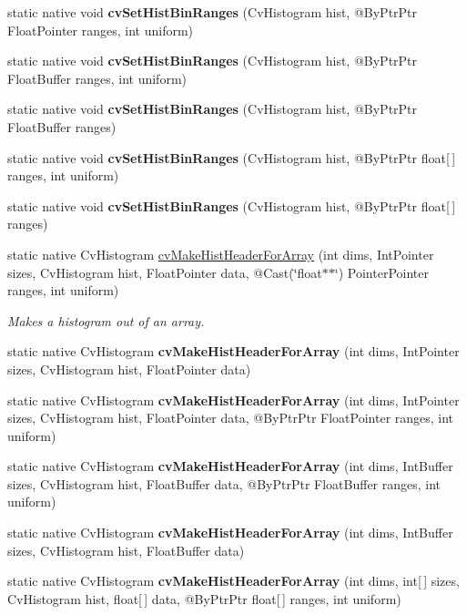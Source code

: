 \begin{DoxyCompactItemize}
\item 
static native void {\bfseries cv\+Set\+Hist\+Bin\+Ranges} (Cv\+Histogram hist, @By\+Ptr\+Ptr Float\+Pointer ranges, int uniform)
\item 
static native void {\bfseries cv\+Set\+Hist\+Bin\+Ranges} (Cv\+Histogram hist, @By\+Ptr\+Ptr Float\+Buffer ranges, int uniform)
\item 
static native void {\bfseries cv\+Set\+Hist\+Bin\+Ranges} (Cv\+Histogram hist, @By\+Ptr\+Ptr Float\+Buffer ranges)
\item 
static native void {\bfseries cv\+Set\+Hist\+Bin\+Ranges} (Cv\+Histogram hist, @By\+Ptr\+Ptr float\mbox{[}$\,$\mbox{]} ranges, int uniform)
\item 
static native void {\bfseries cv\+Set\+Hist\+Bin\+Ranges} (Cv\+Histogram hist, @By\+Ptr\+Ptr float\mbox{[}$\,$\mbox{]} ranges)
\item 
static native Cv\+Histogram \hyperlink{group__imgproc__c_ga2bdfb77a902cc0010861d3960e11a5c9}{cv\+Make\+Hist\+Header\+For\+Array} (int dims, Int\+Pointer sizes, Cv\+Histogram hist, Float\+Pointer data, @Cast(\char`\"{}float$\ast$$\ast$\char`\"{}) Pointer\+Pointer ranges, int uniform)
\begin{DoxyCompactList}\small\item\em Makes a histogram out of an array. \end{DoxyCompactList}\item 
static native Cv\+Histogram {\bfseries cv\+Make\+Hist\+Header\+For\+Array} (int dims, Int\+Pointer sizes, Cv\+Histogram hist, Float\+Pointer data)
\item 
static native Cv\+Histogram {\bfseries cv\+Make\+Hist\+Header\+For\+Array} (int dims, Int\+Pointer sizes, Cv\+Histogram hist, Float\+Pointer data, @By\+Ptr\+Ptr Float\+Pointer ranges, int uniform)
\item 
static native Cv\+Histogram {\bfseries cv\+Make\+Hist\+Header\+For\+Array} (int dims, Int\+Buffer sizes, Cv\+Histogram hist, Float\+Buffer data, @By\+Ptr\+Ptr Float\+Buffer ranges, int uniform)
\item 
static native Cv\+Histogram {\bfseries cv\+Make\+Hist\+Header\+For\+Array} (int dims, Int\+Buffer sizes, Cv\+Histogram hist, Float\+Buffer data)
\item 
static native Cv\+Histogram {\bfseries cv\+Make\+Hist\+Header\+For\+Array} (int dims, int\mbox{[}$\,$\mbox{]} sizes, Cv\+Histogram hist, float\mbox{[}$\,$\mbox{]} data, @By\+Ptr\+Ptr float\mbox{[}$\,$\mbox{]} ranges, int uniform)
\item 
$$
\end{DoxyCompactItemize}
